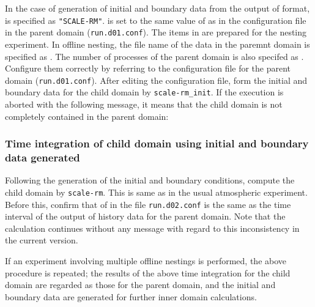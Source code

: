 In the case of generation of initial and boundary data from the output of \scalerm format,
 is specified as \verb|"SCALE-RM"|.
 is set to the same value of 
as in the configuration file in the parent domain (\verb|run.d01.conf|).
The items in  are prepared for the nesting experiment.
In offline nesting,  the file name of the data in the paremnt domain is specified as  .
The number of processes of the parent domain is also specifed as .
Configure them correctly by referring to the configuration file for the parent domain (\verb|run.d01.conf|). After editing the configuration file, form the initial and boundary data for the child domain by \verb|scale-rm_init|. If the execution is aborted with the following message, it means that the child domain is not completely contained in the parent domain:


\subsubsection{Time integration of child domain using initial and boundary data generated}

Following the generation of the initial and boundary conditions, compute the child domain by \verb|scale-rm|. This is same as in the usual atmospheric experiment. Before this, confirm that   of  in the file \verb|run.d02.conf| is the same as the time interval of the output of history data for the parent domain. Note that the calculation continues without any message with regard to this inconsistency in the current version.

If an experiment involving multiple offline nestings is performed, the above procedure is repeated; the results of the above time integration for the child domain are regarded as those for the parent domain, and the initial and boundary data are generated for further inner domain calculations. 

